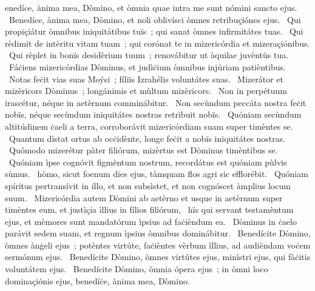 \psalmChapterWithInscription{}
{ }
{%
enedíce, ànima mea, Dòmino, et òmnia quae intra me sunt nómini sancto ejus. 
~Benedíce, ànima mea, Dòmino, et noli oblivísci òmnes retribuçiónes ejus. 
~Qui propiçiátur òmnibus iniquitátibus tuïs~; qui sanat òmnes infirmitátes tuas. 
~Qui rèdimit de intèritu vitam tuam~; qui corónat te in mizericórdia et mizeraçiónibus. 
~Qui rèplet in bonïs desidèrium tuum~; renovábitur ut àquilae juvèntüs tua. 
~Fáċiens mizericórdias Dòminus, et judìċium òmnibus injúriam patièntibus. 
~Notas feċit vias suas Moýsi~; fíliïs Izrahélis voluntátes suas. 
~Mizerátor et mizèricors Dòminus~; longánimis et mùltum mizèricors. 
~Non in perpétuum irascétur, néque in aetèrnum comminábitur. 
~Non secùndum peccáta nostra feċit nobïs, néque secùndum iniquitátes nostras retrìbuit nobïs. 
~Quóniam secùndum altitúdinem ċaeli a terra, corroborávit mizericórdiam suam super timèntes se. 
~Quantum dìstat ortus ab ocċidènte, longe feċit a nobïs iniquitátes nostras. 
~Quómodo mizerétur pàter filiórum, mizèrtus est Dòminus timèntibus se. 
~Quóniam ìpse cognóvit figmèntum nostrum, recordátus est quóniam pùlvis sùmus. 
~hòmo, sicut foenum dies ejus, tàmquam flos agri sic efflorébit. 
~Quóniam spíritus pertransívit in illo, et non subsìstet, et non cognóscet àmplius locum suum. 
~Mizericórdia autem Dòmini ab aetèrno et usque in aetèrnum super timèntes eum, et justìçia ìllius in fílios filiórum, 
~hïs qui servant testamèntum ejus, et mèmores sunt mandatórum ìpsius ad faċièndum ea. 
~Dòminus in ċaelo parávit sedem suam, et regnum ìpsius òmnibus dominábitur. 
~Benedícite Dòmino, òmnes ànġeli ejus~; potèntes virtúte, faċièntes vèrbum ìllius, ad audièndam voċem sermónum ejus. 
~Benedícite Dòmino, òmnes virtútes ejus, minìstri ejus, qui fàċitis voluntátem ejus. 
~Benedícite Dòmino, òmnia ópera ejus~; in òmni loco dominaçiónis ejus, benedíċe, ànima mea, Dòmino. 
}
